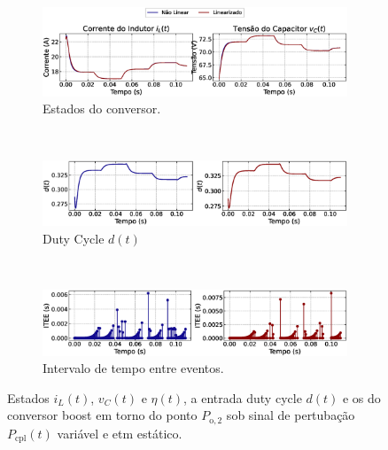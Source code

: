 \begin{figure}[H]
  \centering
  \captionsetup{justification=centering}
  \begin{subfigure}{1.\textwidth}
    \centering
    \includegraphics[width=1.\textwidth]{figuras/dynamic-etm/boost/sim2/op2/result.eps}
    \caption{Estados do conversor.}
    \label{fig:boost_converter_variable_pcpl_dynamic_etm_op2_a}
  \end{subfigure}
  \\[6pt]
  \begin{subfigure}{1.\textwidth}
    \centering
    \includegraphics[width=1.\textwidth]{figuras/dynamic-etm/boost/sim2/op2/duty-cycle.eps}
    \caption{Duty Cycle $d(t)$}
    \label{fig:boost_converter_variable_pcpl_dynamic_etm_op2_b}
  \end{subfigure}
  \\[6pt]
  \begin{subfigure}{1.\textwidth}
    \centering
    \includegraphics[width=1.\textwidth]{figuras/dynamic-etm/boost/sim2/op2/inter-event-times.eps}
    \caption{Intervalo de tempo entre eventos.}
    \label{fig:boost_converter_variable_pcpl_dynamic_etm_op2_c}
  \end{subfigure}
  \caption{Estados $i_L(t)$, $v_C(t)$ e $\eta(t)$, a entrada duty cycle $d(t)$ e os  do conversor boost em torno do ponto $P_{\mathrm{o}, 2}$ sob sinal de pertubação $P_{\mathrm{cpl}}(t)$ variável e \acrshort{etm} estático.}
  \label{fig:boost_converter_variable_pcpl_dynamic_etm_op2}
\end{figure}

